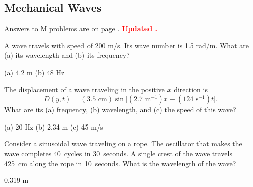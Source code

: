 \subsection{Mechanical Waves} 


Answers to M problems are on page \pageref{waves_prob_answers}.  \textbf{\textcolor{red}{Updated \DTMnow.}}

\begin{Exercise}
A wave travels with speed of 200 m/s.  Its wave number is 1.5 rad/m.  What are (a) its wavelength and (b) its frequency?
\end{Exercise}
\begin{Answer}
(a) 4.2 m (b) 48 Hz
\end{Answer}


\begin{Exercise}
The displacement of a wave traveling in the positive $x$ direction is
$$D(y,t)=(3.5\text{ cm})  \sin\Big[ \left( 2.7 \text{ m}^{-1} \right) x -  (124\text{ s}^{-1})t \Big] .$$
What are its (a) frequency, (b) wavelength, and (c) the speed of this wave?
\end{Exercise}
\begin{Answer}
(a) 20 Hz (b) 2.34 m (c) 45 m/s
\end{Answer}


\begin{Exercise}
Consider a sinusoidal wave traveling on a rope.  The oscillator that makes the wave completes 40~cycles in 30~seconds.  A single crest of the wave travels 425~cm along the rope in 10~seconds.  What is the wavelength of the wave?  
\end{Exercise}
\begin{Answer}
0.319 m
\end{Answer}


